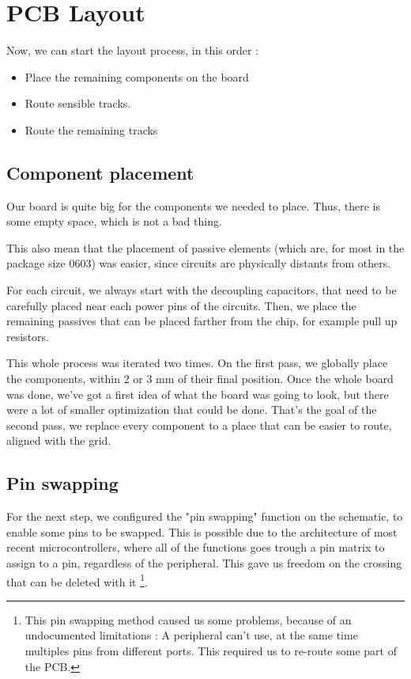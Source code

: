 \section{PCB Layout}
Now, we can start the layout process, in this order :

\begin{itemize}[noitemsep]
    \item   Place the remaining components on the board
    \item   Route sensible tracks.
    \item   Route the remaining tracks
\end{itemize}

\subsection{Component placement}
Our board is quite big for the components we needed to place. Thus, there is
some empty space, which is not a bad thing.

This also mean that the placement of passive elements (which are, for most in
the package size 0603) was easier, since circuits are physically distants from
others.

For each circuit, we always start with the decoupling capacitors, that need to
be carefully placed near each power pins of the circuits. Then, we place the
remaining passives that can be placed farther from the chip, for example pull
up resistors.

This whole process was iterated two times. On the first pass, we globally place
the components, within 2 or 3 mm of their final position. Once the whole board
was done, we've got a first idea of what the board was going to look, but there
were a lot of smaller optimization that could be done. That's the goal of the
second pass, we replace every component to a place that can be easier to route,
aligned with the grid.

\subsection{Pin swapping}\label{sec:pin_swap}
For the next step, we configured the "pin swapping" function on the schematic,
to enable some pins to be swapped. This is possible due to the architecture of
most recent microcontrollers, where all of the functions goes trough a pin
matrix to assign to a pin, regardless of the peripheral. This gave us freedom
on the crossing that can be deleted with it \footnote{ This pin swapping method
    caused us some problems, because of an undocumented limitations : A peripheral
    can't use, at the same time multiples pins from different ports. This required
    us to re-route some part of the PCB. }.

